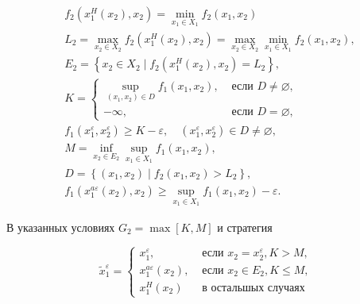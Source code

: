 \documentclass[10pt]{article}
\begin{document}
\[

\begin{aligned}

& f_{2}\left(x_{1}^{H}\left(x_{2}\right), x_{2}\right)=\min _{x_{1} \in X_{1}} f_{2}\left(x_{1}, x_{2}\right) \\

& L_{2}=\max _{x_{2} \in X_{2}} f_{2}\left(x_{1}^{H}\left(x_{2}\right), x_{2}\right)=\max _{x_{2} \in X_{2}} \min _{x_{1} \in X_{1}} f_{2}\left(x_{1}, x_{2}\right) \text {, } \\

& E_{2}=\left\{x_{2} \in X_{2} \mid f_{2}\left(x_{1}^{H}\left(x_{2}\right), x_{2}\right)=L_{2}\right\}, \\

& K=\left\{\begin{array}{cl}

\sup _{\left(x_{1}, x_{2}\right) \in D} f_{1}\left(x_{1}, x_{2}\right), & \text { если } D \neq \varnothing, \\

-\infty, & \text { если } D=\varnothing,

\end{array}\right. \\

& f_{1}\left(x_{1}^{\varepsilon}, x_{2}^{\varepsilon}\right) \geqslant K-\varepsilon, \quad\left(x_{1}^{\varepsilon}, x_{2}^{\varepsilon}\right) \in D \neq \varnothing, \\

& M=\inf _{x_{2} \in E_{2}} \sup _{x_{1} \in X_{1}} f_{1}\left(x_{1}, x_{2}\right) \text {, } \\

& D=\left\{\left(x_{1}, x_{2}\right) \mid f_{2}\left(x_{1}, x_{2}\right)>L_{2}\right\}, \\

& f_{1}\left(x_{1}^{a \varepsilon}\left(x_{2}\right), x_{2}\right) \geqslant \sup _{x_{1} \in X_{1}} f_{1}\left(x_{1}, x_{2}\right)-\varepsilon .

\end{aligned}

\]



В указанных условиях $G_{2}=\max [K, M]$ и стратегия



\[

\tilde{x}_{1}^{\varepsilon}=\left\{\begin{array}{cl}

x_{1}^{\varepsilon}, & \text { если } x_{2}=x_{2}^{\varepsilon}, K>M, \\

x_{1}^{a \varepsilon}\left(x_{2}\right), & \text { если } x_{2} \in E_{2}, K \leqslant M, \\

x_{1}^{H}\left(x_{2}\right) & \text { в остальшых случаях }

\end{array}\right.

\]
\end{document}
